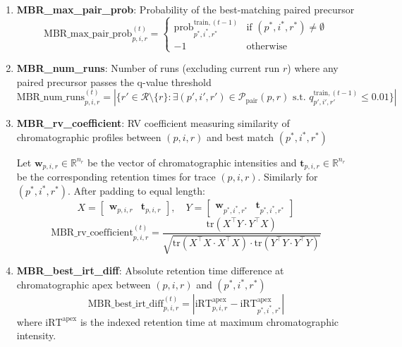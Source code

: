 \documentclass[pdflatex,sn-nature]{sn-jnl}
\begin{document}
\begin{enumerate}
\item \textbf{MBR\_max\_pair\_prob}: Probability of the best-matching paired precursor
\begin{equation}
    \text{MBR\_max\_pair\_prob}_{p,i,r}^{(t)} = \begin{cases}
        \text{prob}_{p^*,i^*,r^*}^{\text{train},(t-1)} & \text{if } (p^*,i^*,r^*) \neq \emptyset \\
        -1 & \text{otherwise}
    \end{cases}
\end{equation}

\item \textbf{MBR\_num\_runs}: Number of runs (excluding current run $r$) where any paired precursor passes the q-value threshold
\begin{equation}
    \text{MBR\_num\_runs}_{p,i,r}^{(t)} = |\{r' \in \mathcal{R} \setminus \{r\} : \exists (p',i',r') \in \mathcal{P}_{\text{pair}}(p,r) \text{ s.t. } q_{p',i',r'}^{\text{train},(t-1)} \leq 0.01\}|
\end{equation}

\item \textbf{MBR\_rv\_coefficient}: RV coefficient measuring similarity of chromatographic profiles between $(p,i,r)$ and best match $(p^*,i^*,r^*)$

Let $\mathbf{w}_{p,i,r} \in \mathbb{R}^{n_r}$ be the vector of chromatographic intensities and $\mathbf{t}_{p,i,r} \in \mathbb{R}^{n_r}$ be the corresponding retention times for trace $(p,i,r)$. Similarly for $(p^*,i^*,r^*)$. After padding to equal length:
\begin{equation}
    X = \begin{bmatrix} \mathbf{w}_{p,i,r} & \mathbf{t}_{p,i,r} \end{bmatrix}, \quad Y = \begin{bmatrix} \mathbf{w}_{p^*,i^*,r^*} & \mathbf{t}_{p^*,i^*,r^*} \end{bmatrix}
\end{equation}
\begin{equation}
    \text{MBR\_rv\_coefficient}_{p,i,r}^{(t)} = \frac{\text{tr}(X^\top Y \cdot Y^\top X)}{\sqrt{\text{tr}(X^\top X \cdot X^\top X) \cdot \text{tr}(Y^\top Y \cdot Y^\top Y)}}
\end{equation}

\item \textbf{MBR\_best\_irt\_diff}: Absolute retention time difference at chromatographic apex between $(p,i,r)$ and $(p^*,i^*,r^*)$
\begin{equation}
    \text{MBR\_best\_irt\_diff}_{p,i,r}^{(t)} = |\text{iRT}_{p,i,r}^{\text{apex}} - \text{iRT}_{p^*,i^*,r^*}^{\text{apex}}|
\end{equation}
where $\text{iRT}^{\text{apex}}$ is the indexed retention time at maximum chromatographic intensity.


\end{enumerate}
\end{document}
